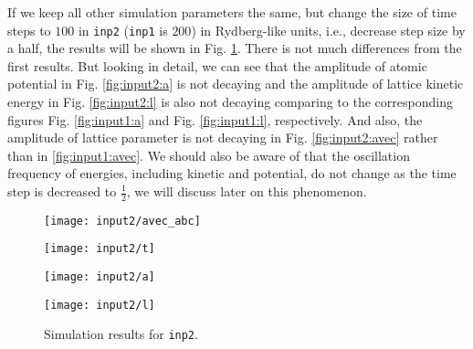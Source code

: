 If we keep all other simulation parameters the same, but change
the size of time steps to $100$ in \texttt{inp2} (\texttt{inp1} is $200$) in Rydberg-like units,
i.e., decrease step size by a half, the results will be shown in Fig. \ref{fig:input2}.
There is not much differences from the first results. But looking in detail,
we can see that the amplitude of atomic potential in Fig. \ref{fig:input2:a} is not decaying
and the amplitude of lattice kinetic energy in Fig. \ref{fig:input2:l} is also not decaying
comparing to the corresponding figures Fig. \ref{fig:input1:a} and Fig. \ref{fig:input1:l},
respectively. And also, the amplitude of lattice parameter is not decaying in 
Fig. \ref{fig:input2:avec} rather than in \ref{fig:input1:avec}. We should also be aware of
that the oscillation frequency of energies, including kinetic and potential, do not change
as the time step is decreased to $\frac{ 1 }{ 2 }$, we will discuss later on this phenomenon.
\begin{figure}[h]
  \begin{minipage}[t]{0.45\textwidth}
    \texttt{[image: input2/avec\_abc]}
    \label{fig:input2:avec}
  \end{minipage}
  \hfil
  \begin{minipage}[t]{0.45\textwidth}
    \texttt{[image: input2/t]}
    \label{fig:input2:t}
  \end{minipage}
  \hfil
  \vfill
  \begin{minipage}[t]{0.45\textwidth}
    \texttt{[image: input2/a]}
    \label{fig:input2:a}
  \end{minipage}
  \hfil
  \begin{minipage}[t]{0.45\textwidth}
    \texttt{[image: input2/l]}
    \label{fig:input2:l}
  \end{minipage}
  \caption{Simulation results for \texttt{inp2}.}
  \label{fig:input2}
\end{figure}

